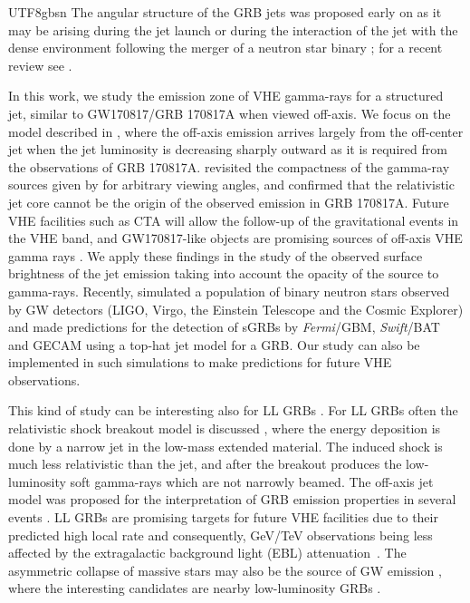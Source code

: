 \documentclass[fleqn,usenatbib]{mnras}
\begin{document}
\begin{CJK*}{UTF8}{gbsn}
The angular structure of the GRB jets was proposed early on \cite[e.g.,][]{meszarosreeswijers98, zhanga, rossi03, kumargranot2003, granotkumar2003} as it may be arising  during the jet launch or during the interaction of the jet with the dense environment following the merger of a neutron star binary \citep{aloy2005, murguiaberthier2017, kathirgamaraju2018, preau2021, gottlieb2021}; for a recent review see \cite{salafiaghirlanda2022}. 

In this work, we study the emission zone of VHE gamma-rays for a structured jet, similar to GW170817/GRB 170817A when viewed off-axis. We focus on the model described in \cite{Ioka:2019jlj}, where the off-axis emission arrives largely from the off-center jet when the jet luminosity is decreasing sharply outward as it is required from the observations of GRB 170817A. \cite{matsumotoB} revisited the compactness of the gamma-ray sources given by \cite{lithwick01} for arbitrary viewing angles, and confirmed that the relativistic jet core cannot be the origin of the observed emission in GRB 170817A. Future VHE facilities such as CTA will allow the follow-up of the gravitational events in the VHE band, and GW170817-like objects are promising sources of off-axis VHE gamma rays \citep{murase+2018}. We apply these findings in the study of the observed surface brightness of the jet emission taking into account the opacity of the source to gamma-rays. 
Recently, \cite{hendriks22} simulated a population of binary neutron stars observed by GW detectors (LIGO, Virgo, the Einstein Telescope and the Cosmic Explorer) and made predictions for the detection of sGRBs by {\it Fermi}/GBM, {\it Swift}/BAT and GECAM using a top-hat jet model for a GRB. Our study can also be implemented in such simulations to make predictions for future VHE observations.

This kind of study can be interesting also for LL GRBs \citep{Soderberg06,Liang07}. For LL GRBs often the relativistic shock breakout model is discussed \citep{Campana06,nakarsari2012, nakar15}, where the energy deposition is done by a narrow jet in the low-mass extended material. The induced shock is much less relativistic than the jet, and after the breakout produces the low-luminosity soft gamma-rays which are not narrowly beamed. The off-axis jet model was proposed for the interpretation of GRB emission properties in several events \citep{iokanakamura2001, yamazaki03, waxman2004, sato21}. LL GRBs are promising targets for future VHE facilities due to their predicted high local rate \citep{wanderman2010} and consequently, GeV/TeV observations being less affected by the extragalactic background light (EBL) attenuation~\citep{murase+2008,rudolph:2022}. The asymmetric collapse of massive stars may also be the source of GW emission \citep{shibata21}, where the interesting candidates are nearby low-luminosity GRBs \citep{kobayashimeszaros2003, daigne07, nakar15}. 


\end{CJK*}
\end{document}
